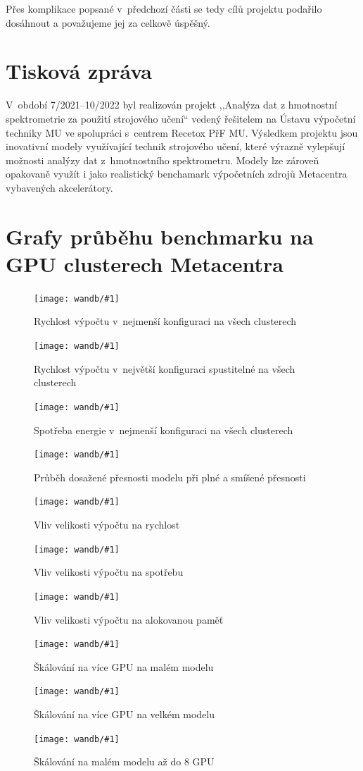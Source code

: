 \documentclass[a4paper,11pt]{article}
\begin{document}
Přes komplikace popsané v~předchozí části se tedy cílů projektu podařilo dosáhnout
a považujeme jej za celkově úspěšný.

\section{Tisková zpráva}

V~období 7/2021--10/2022 byl realizován projekt ,,Analýza dat z hmotnostní spektrometrie za použití strojového učení``
vedený řešitelem na Ústavu výpočetní techniky MU ve spolupráci s~centrem Recetox PřF MU.
Výsledkem projektu jsou inovativní modely využívající technik strojového učení,
které výrazně vylepšují možnosti analýzy dat z~hmotnostního spektrometru.
Modely lze zároveň opakovaně využít i jako realistický benchamark výpočetních zdrojů Metacentra vybavených
akcelerátory.






\twocolumn
\appendix
\section{Grafy průběhu benchmarku na GPU clusterech Metacentra}

\def\graph#1#2{
\begin{figure}[h]
\begin{center}
\texttt{[image: wandb/\#1]}
\caption{#2}
\label{f:#1}
\end{center}
\end{figure}
}

\graph{all_6_6_300_1_64_32}{Rychlost výpočtu v~nejmenší konfiguraci na všech clusterech}

\graph{all_12_12_300_1_64_32}{Rychlost výpočtu v~největší konfiguraci spustitelné na všech clusterech}

\graph{power_all_6_6_300_1_64_32}{Spotřeba energie v~nejmenší konfiguraci na všech clusterech}

\graph{val_6_6_300_1_64_both}{Průběh dosažené přesnosti modelu při plné a smíšené přesnosti}

\graph{galdor_any_1_128_16}{Vliv velikosti výpočtu na rychlost}

\graph{power_galdor_any_1_128_16}{Vliv velikosti výpočtu na spotřebu}

\graph{mem_galdor_any_1_128_16}{Vliv velikosti výpočtu na alokovanou paměť}

\graph{galdor_6_6_120_any_64_both}{Škálování na více GPU na malém modelu}
\graph{galdor_12_12_300_any_128_both}{Škálování na více GPU na velkém modelu}
\graph{fer_6_6_120_any_64_both}{Škálování na malém modelu až do 8 GPU}
\end{document}
